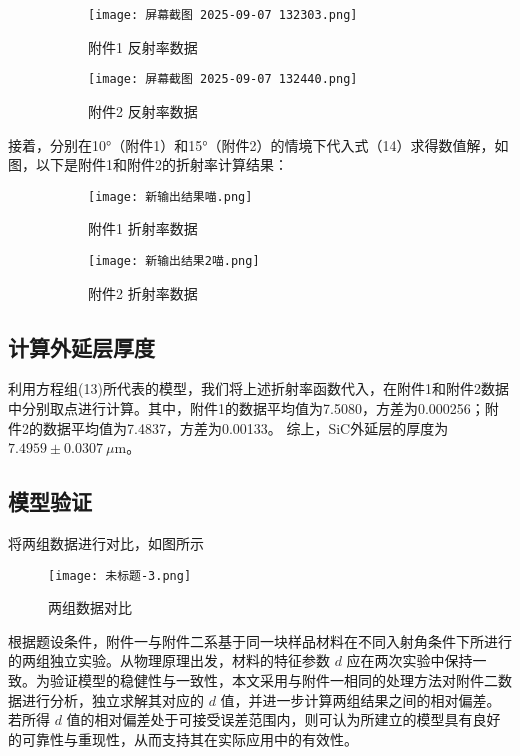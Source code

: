 \documentclass[withoutpreface,bwprint]{cumcmthesis}
\begin{document}
\begin{figure}[H]
  \centering
  \begin{subfigure}[b]{0.45\linewidth}
    \texttt{[image: 屏幕截图 2025-09-07 132303.png]}

    \caption{附件1 反射率数据}
    \label{fig:附件1 反射率数据}
  \end{subfigure}
  \hfill
  \begin{subfigure}[b]{0.45\linewidth}
    \texttt{[image: 屏幕截图 2025-09-07 132440.png]}
    \caption{附件2 反射率数据}
    \label{fig:附件2 反射率数据}
  \end{subfigure}
  \caption{}
  \label{fig:double2}
\end{figure}
接着，分别在10°（附件1）和15°（附件2）的情境下代入式（14）求得数值解，如图，以下是附件1和附件2的折射率计算结果：
\begin{figure}[H]
  \centering
  \begin{subfigure}[b]{0.49\linewidth}
    \texttt{[image: 新输出结果喵.png]}

    \caption{附件1 折射率数据}
    \label{fig:附件1 反射率数据}
  \end{subfigure}
  \hfill
  \begin{subfigure}[b]{0.49\linewidth}
    \texttt{[image: 新输出结果2喵.png]}
    \caption{附件2 折射率数据}
    \label{fig:}
  \end{subfigure}
  \caption{}
  \label{fig:double3}
\end{figure}

\subsection{计算外延层厚度}
利用方程组(13)所代表的模型，我们将上述折射率函数代入，在附件1和附件2数据中分别取点进行计算。其中，附件1的数据平均值为7.5080，方差为0.000256；附件2的数据平均值为7.4837，方差为0.00133。
综上，SiC外延层的厚度为$7.4959\pm0.0307~\mu\mathrm{m}$。
\subsection{模型验证}
将两组数据进行对比，如图所示
\begin{figure}[H]
  \centering
  \texttt{[image: 未标题-3.png]}
  \caption{两组数据对比}
  \label{fig:untitled3}
\end{figure}
根据题设条件，附件一与附件二系基于同一块样品材料在不同入射角条件下所进行的两组独立实验。从物理原理出发，材料的特征参数 $ d $ 应在两次实验中保持一致。为验证模型的稳健性与一致性，本文采用与附件一相同的处理方法对附件二数据进行分析，独立求解其对应的 $ d $ 值，并进一步计算两组结果之间的相对偏差。若所得 $ d $ 值的相对偏差处于可接受误差范围内，则可认为所建立的模型具有良好的可靠性与重现性，从而支持其在实际应用中的有效性。
\end{document}

